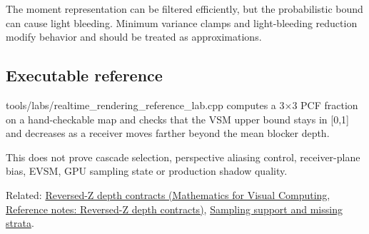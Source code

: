 The moment representation can be filtered efficiently, but the probabilistic bound can cause light bleeding. Minimum variance clamps and light-bleeding reduction modify behavior and should be treated as approximations.

\subsection{Executable reference}\label{appendix-7cac8a689849-executable-reference}

tools/labs/realtime\_rendering\_reference\_lab.cpp computes a 3×3 PCF fraction on a hand-checkable map and checks that the VSM upper bound stays in {[}0,1{]} and decreases as a receiver moves farther beyond the mean blocker depth.

This does not prove cascade selection, perspective aliasing control, receiver-plane bias, EVSM, GPU sampling state or production shadow quality.

Related: \href{../02-Mathematics-for-Visual-Computing/main.pdf\#nameddest=appendix-275ec8847057}{Reversed-Z depth contracts (Mathematics for Visual Computing, Reference notes: Reversed-Z depth contracts)}, \hyperref[appendix-10308c3d753e]{Sampling support and missing strata}.

